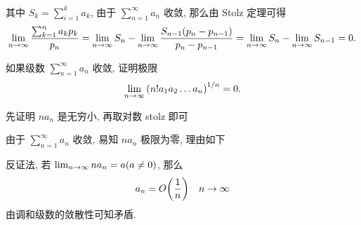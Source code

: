 \begin{exercise}[series=exer]
\begin{answer}
\begin{align*}
      \end{align*}
      其中 $ S_{k} = \sum_{i = 1}^{k}a_{k} $, 由于 $ \sum_{n = 1}^{\infty}a_{n} $ 收敛, 那么由 Stolz 定理可得
      \begin{align*}
          \lim_{n \to \infty}\frac{\sum_{k = 1}^{n} a_{k}p_{k}}{p_{n}} = \lim_{n \to \infty}S_{n} - \lim_{n \to \infty}\frac{S_{n - 1}(p_{n} - p_{n - 1})}{p_{n} - p_{n - 1}} = \lim_{n \to \infty}S_{n} - \lim_{n \to \infty}S_{n - 1} = 0.
      \end{align*}
  \end{answer}
  \item 如果级数 $ \sum_{n = 1}^{\infty} a_{n} $ 收敛, 证明极限
  \begin{align*}
      \lim_{n \to \infty}\qty(n! a_{1} a_{2} \dots a_{n})^{1/n} = 0.
  \end{align*}
  \begin{hint}
    先证明 $na_n$ 是无穷小, 再取对数 stolz 即可
  \end{hint}
  \begin{answer}
    由于 $ \sum_{n = 1}^{\infty} a_{n} $ 收敛, 易知 $na_n $ 极限为零, 理由如下

    反证法, 若 $\lim_{n \to \infty}na_n = a(a\neq 0)$, 那么 
    \begin{align*}
        a_n =O\qty(\frac{1}{n}) \quad n\to \infty
    \end{align*}
    由调和级数的敛散性可知矛盾.


\end{answer}
\end{exercise}
